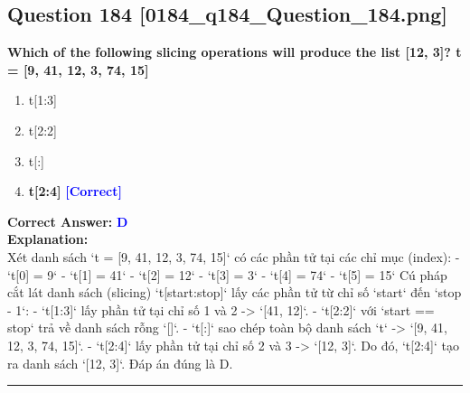 \documentclass[11pt,a4paper]{article}
\begin{document}
\begin{minipage}{\textwidth}
\subsection*{Question 184 \quad \footnotesize{[0184_q184_Question_184.png]}}
\noindent \textbf{Which of the following slicing operations will produce the list [12, 3]? t = [9, 41, 12, 3, 74, 15]}

\begin{enumerate}[label=\Alph*.]
    \item t[1:3]
    \item t[2:2]
    \item t[:]
    \item \textbf{t[2:4]} \hfill \textcolor{blue}{\textbf{[Correct]}}
\end{enumerate}

\noindent \textbf{Correct Answer:} \textcolor{blue}{\textbf{D}} \\[4pt]
\noindent \textbf{Explanation:}\\
Xét danh sách `t = [9, 41, 12, 3, 74, 15]` có các phần tử tại các chỉ mục (index):\newline
- `t[0] = 9`\newline
- `t[1] = 41`\newline
- `t[2] = 12`\newline
- `t[3] = 3`\newline
- `t[4] = 74`\newline
- `t[5] = 15`\newline
\newline
Cú pháp cắt lát danh sách (slicing) `t[start:stop]` lấy các phần tử từ chỉ số `start` đến `stop - 1`:\newline
- `t[1:3]` lấy phần tử tại chỉ số 1 và 2 -> `[41, 12]`.\newline
- `t[2:2]` với `start == stop` trả về danh sách rỗng `[]`.\newline
- `t[:]` sao chép toàn bộ danh sách `t` -> `[9, 41, 12, 3, 74, 15]`.\newline
- `t[2:4]` lấy phần tử tại chỉ số 2 và 3 -> `[12, 3]`.\newline
Do đó, `t[2:4]` tạo ra danh sách `[12, 3]`. Đáp án đúng là D.
\end{minipage}
\vspace{0.8cm}
\hrule
\vspace{0.5cm}
\end{document}

